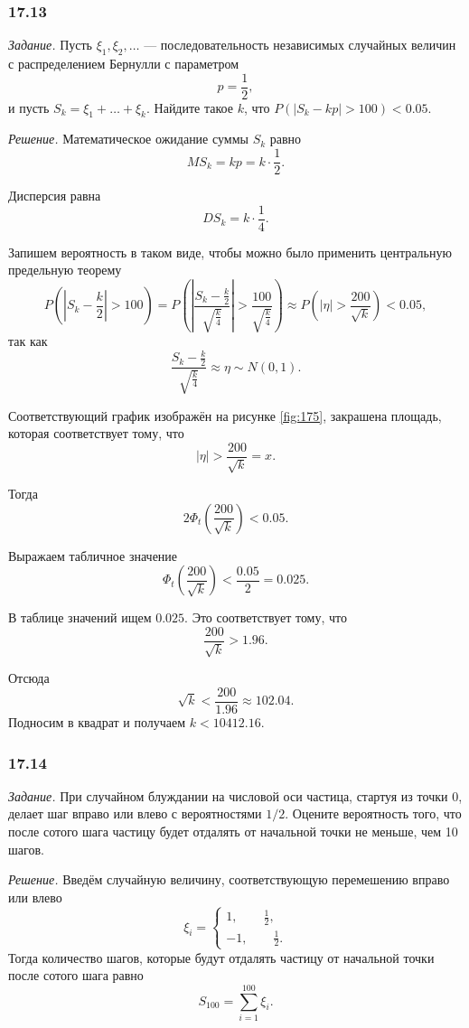 \subsubsection*{17.13}

\textit{Задание.}
Пусть $ \xi_1, \xi_2, \dotsc $ ---
последовательность независимых случайных величин с распределением Бернулли с параметром
$$p =
  \frac{1}{2},$$
и пусть $S_k = \xi_1 + \dotsc + \xi_k$.
Найдите такое $k$, что $P \left( \left| S_k - kp \right| > 100 \right) < 0.05$.

\textit{Решение.} Математическое ожидание суммы $S_k$ равно
$$MS_k =
  kp =
  k \cdot \frac{1}{2}.$$

Дисперсия равна
$$DS_k =
  k \cdot \frac{1}{4}.$$

Запишем вероятность в таком виде, чтобы можно было применить центральную предельную теорему
$$P \left( \left| S_k - \frac{k}{2} \right| > 100 \right) =
  P \left(
    \left| \frac{S_k - \frac{k}{2}}{ \sqrt{ \frac{k}{4}}} \right| > \frac{100}{ \sqrt{ \frac{k}{4}}}
  \right) \approx
  P \left( \left| \eta \right| > \frac{200}{ \sqrt{k}} \right) <
  0.05,$$
так как
$$ \frac{S_k - \frac{k}{2}}{ \sqrt{ \frac{k}{4}}} \approx
  \eta \sim
  N \left( 0, 1 \right).$$

Соответствующий график изображён на рисунке \ref{fig:175}, закрашена площадь,
которая соответствует тому, что
$$ \left| \eta \right| >
  \frac{200}{ \sqrt{k}} =
  x.$$

Тогда
$$2 \Phi_t \left( \frac{200}{ \sqrt{k}} \right) < 0.05.$$

Выражаем табличное значение
$$ \Phi_t \left( \frac{200}{ \sqrt{k}} \right) <
  \frac{0.05}{2} =
  0.025.$$

В таблице значений ищем $0.025$.
Это соответствует тому, что
$$ \frac{200}{ \sqrt{k}} >
  1.96.$$

Отсюда
$$ \sqrt{k} <
  \frac{200}{1.96} \approx
  102.04.$$
Подносим в квадрат и получаем $k < 10412.16$.

\subsubsection*{17.14}

\textit{Задание.}
При случайном блуждании на числовой оси частица, стартуя из точки 0,
делает шаг вправо или влево с вероятностями $1 / 2$.
Оцените вероятность того, что после сотого шага частицу будет отдалять от начальной точки не меньше,
чем 10 шагов.

\textit{Решение.} Введём случайную величину, соответствующую перемешению вправо или влево
$$ \xi_i =
  \begin{cases}
    1, \qquad \frac{1}{2}, \\
    -1, \qquad \frac{1}{2}.
  \end{cases}$$
Тогда количество шагов, которые будут отдалять частицу от начальной точки после сотого шага равно
$$S_{100} =
  \sum \limits_{i = 1}^{100} \xi_i.$$

